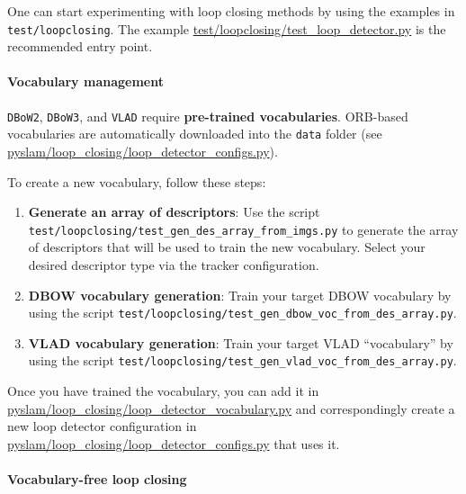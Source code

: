 \documentclass{article}
\let\oldparagraph\paragraph
\renewcommand{\paragraph}[1]{\oldparagraph{#1}\mbox{}}
\begin{document}
One can start experimenting with loop closing methods by using the
examples in \texttt{test/loopclosing}. The example
\href{https://github.com/luigifreda/pyslam/blob/master/test/loopclosing/test_loop_detector.py}{test/loopclosing/test\_loop\_detector.py}
is the recommended entry point.

\hypertarget{vocabulary-management}{%
\paragraph{Vocabulary management}\label{vocabulary-management}}

\texttt{DBoW2}, \texttt{DBoW3}, and \texttt{VLAD} require
\textbf{pre-trained vocabularies}. ORB-based vocabularies are
automatically downloaded into the \texttt{data} folder (see
\href{https://github.com/luigifreda/pyslam/blob/master/pyslam/loop_closing/loop_detector_configs.py}{pyslam/loop\_closing/loop\_detector\_configs.py}).

To create a new vocabulary, follow these steps:

\begin{enumerate}
\def\labelenumi{\arabic{enumi}.}
\item
  \textbf{Generate an array of descriptors}: Use the script \\
  \texttt{test/loopclosing/test\_gen\_des\_array\_from\_imgs.py} to
  generate the array of descriptors that will be used to train the new
  vocabulary. Select your desired descriptor type via the tracker
  configuration.
\item
  \textbf{DBOW vocabulary generation}: Train your target DBOW vocabulary
  by using the script
  \texttt{test/loopclosing/test\_gen\_dbow\_voc\_from\_des\_array.py}.
\item
  \textbf{VLAD vocabulary generation}: Train your target VLAD
  ``vocabulary'' by using the script
  \texttt{test/loopclosing/test\_gen\_vlad\_voc\_from\_des\_array.py}.
\end{enumerate}

Once you have trained the vocabulary, you can add it in
\href{https://github.com/luigifreda/pyslam/blob/master/pyslam/loop_closing/loop_detector_vocabulary.py}{pyslam/loop\_closing/loop\_detector\_vocabulary.py} and correspondingly
create a new loop detector configuration in
\href{https://github.com/luigifreda/pyslam/blob/master/pyslam/loop_closing/loop_detector_configs.py}{pyslam/loop\_closing/loop\_detector\_configs.py} that uses it.

\hypertarget{vocabulary-free-loop-closing}{%
\paragraph{Vocabulary-free loop
closing}\label{vocabulary-free-loop-closing}}
\end{document}
